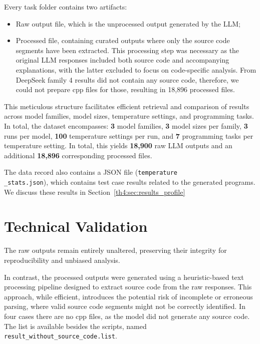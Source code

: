 Every task folder contains two artifacts:
\begin{itemize}
	\item Raw output file, which is the unprocessed output generated by the LLM;
	\item Processed file, containing curated outputs where only the source code segments have been extracted. This processing step was necessary as the original LLM responses included both source code and accompanying explanations, with the latter excluded to focus on code-specific analysis. From DeepSeek family 4 results did not contain any source code, therefore, we could not prepare cpp files for those, resulting in 18,896 processed files.
\end{itemize}

This meticulous structure facilitates efficient retrieval and comparison of results across model families, model sizes, temperature settings, and programming tasks. In total, the dataset encompasses:
\textbf{3} model families,
\textbf{3} model sizes per family,
\textbf{3} runs per model,
\textbf{100} temperature settings per run, and
\textbf{7} programming tasks per temperature setting.
In total, this yields \textbf{18,900} raw LLM outputs and an additional \textbf{18,896} corresponding processed files.

The data record also contains a JSON file (\texttt{temperature\\\_stats.json}), which contains test case results related to the generated programs.
We discuss these results in Section~\ref{th4:sec:results_profile}

\section{Technical Validation}
\label{th4:section:technical_validation}

The raw outputs remain entirely unaltered, preserving their integrity for reproducibility and unbiased analysis.

In contrast, the processed outputs were generated using a heuristic-based text processing pipeline designed to extract source code from the raw responses.
This approach, while efficient, introduces the potential risk of incomplete or erroneous parsing, where valid source code segments might not be correctly identified.
In four cases there are no cpp files, as the model did not generate any source code.
The list is available besides the scripts, named \texttt{result\_without\_source\_code.list}.

